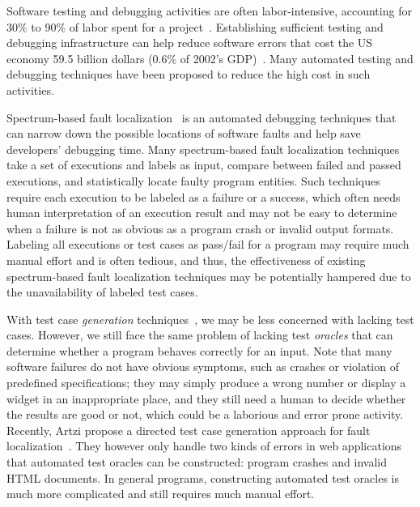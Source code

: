 
Software testing and debugging activities are often labor-intensive, accounting for 30\% to 90\% of labor spent for a project~\citep{Beizer1990}. Establishing sufficient testing and debugging infrastructure can help reduce software errors that cost the US economy 59.5 billion dollars (0.6\% of 2002's GDP)~\citep{NIST2002}.
Many automated testing and debugging techniques have been proposed to reduce the high cost in such activities.


Spectrum-based fault localization~\citep[e.g.][]{JHS02,Abreu:2009.jss,campos2013entropy} is an automated debugging techniques that can narrow down the possible locations of software faults and help save developers' debugging time. Many spectrum-based fault localization techniques take a set of executions and labels as input, compare between failed and passed executions, and statistically locate faulty program entities. Such techniques require each execution to be labeled as a failure or a success, which often needs human interpretation of an execution result and may not be easy to determine when a failure is not as obvious as a program crash or invalid output formats. Labeling all executions or test cases as pass/fail for a program may require much manual effort and is often tedious, and thus, the effectiveness of existing spectrum-based fault localization techniques may be potentially hampered due to the unavailability of labeled test cases.

With test case {\em generation} techniques~\citep{GodefroidKS05,SenMA05}, we may be less concerned with lacking test cases. However, we still face the same problem of lacking test {\em oracles} that can determine whether a program behaves correctly for an input. Note that many software failures do not have obvious symptoms, such as crashes or violation of predefined specifications; they may simply produce a wrong number or display a widget in an inappropriate place, and they still need a human to decide whether the results are good or not, which could be a laborious and error prone activity. Recently, Artzi \etal propose a directed test case generation approach for fault localization~\citep{ArtziDTP10}. They however only handle two kinds of errors in web applications that automated test oracles can be constructed: program crashes and invalid HTML documents. In general programs,
constructing automated test oracles is much more complicated and still requires much manual effort.

